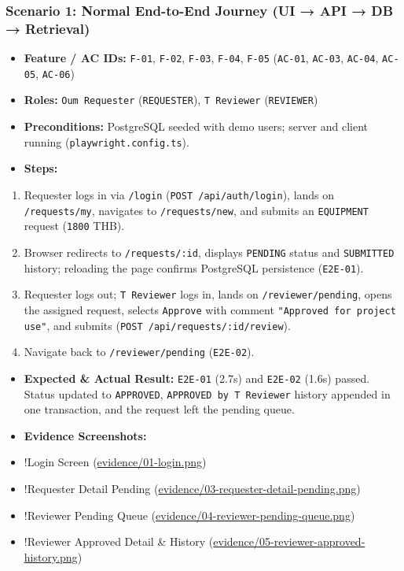 \documentclass[11pt,a4paper]{article}
\begin{document}
\subsubsection{Scenario 1: Normal End-to-End Journey (UI → API → DB → Retrieval)}
\begin{itemize}[leftmargin=*,itemsep=2pt,topsep=2pt]
  \item \textbf{Feature / AC IDs:} \texttt{F-01}, \texttt{F-02}, \texttt{F-03}, \texttt{F-04}, \texttt{F-05} (\texttt{AC-01}, \texttt{AC-03}, \texttt{AC-04}, \texttt{AC-05}, \texttt{AC-06})
  \item \textbf{Roles:} \texttt{Oum Requester} (\texttt{REQUESTER}), \texttt{T Reviewer} (\texttt{REVIEWER})
  \item \textbf{Preconditions:} PostgreSQL seeded with demo users; server and client running (\texttt{playwright.config.ts}).
  \item \textbf{Steps:}
\end{itemize}
\begin{enumerate}[leftmargin=*,itemsep=2pt,topsep=2pt]
  \item Requester logs in via \texttt{/login} (\texttt{POST /api/auth/login}), lands on \texttt{/requests/my}, navigates to \texttt{/requests/new}, and submits an \texttt{EQUIPMENT} request (\texttt{1800} THB).
  \item Browser redirects to \texttt{/requests/:id}, displays \texttt{PENDING} status and \texttt{SUBMITTED} history; reloading the page confirms PostgreSQL persistence (\texttt{E2E-01}).
  \item Requester logs out; \texttt{T Reviewer} logs in, lands on \texttt{/reviewer/pending}, opens the assigned request, selects \texttt{Approve} with comment \texttt{"Approved for project use"}, and submits (\texttt{POST /api/requests/:id/review}).
  \item Navigate back to \texttt{/reviewer/pending} (\texttt{E2E-02}).
\end{enumerate}
\begin{itemize}[leftmargin=*,itemsep=2pt,topsep=2pt]
  \item \textbf{Expected \& Actual Result:} \texttt{E2E-01} (2.7s) and \texttt{E2E-02} (1.6s) passed. Status updated to \texttt{APPROVED}, \texttt{APPROVED by T Reviewer} history appended in one transaction, and the request left the pending queue.
  \item \textbf{Evidence Screenshots:}
  \item !Login Screen (\url{evidence/01-login.png})
  \item !Requester Detail Pending (\url{evidence/03-requester-detail-pending.png})
  \item !Reviewer Pending Queue (\url{evidence/04-reviewer-pending-queue.png})
  \item !Reviewer Approved Detail \& History (\url{evidence/05-reviewer-approved-history.png})
\end{itemize}
\end{document}
